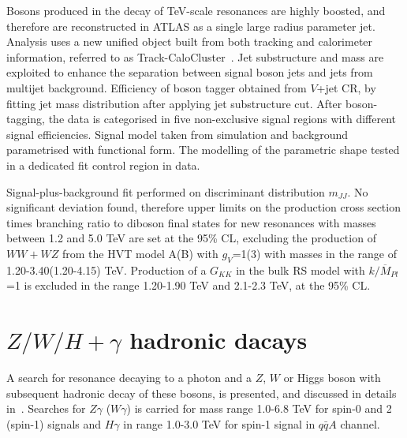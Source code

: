 \documentclass{PoS}
\begin{document}
Bosons produced in the decay of TeV-scale resonances are highly boosted, and therefore are reconstructed in ATLAS as a single large radius parameter jet. 
Analysis uses a new unified object built from both tracking and calorimeter information, referred to as Track-CaloCluster~\cite{ATL-PHYS-PUB-2017-015}. 
Jet substructure and mass are exploited to enhance the separation between signal boson jets and jets from multijet background. 
Efficiency of boson tagger obtained from $V$+jet CR, by fitting jet mass distribution after applying jet substructure cut. %
After boson-tagging, the data is categorised in five non-exclusive signal regions with different signal efficiencies.
Signal model taken from simulation and background parametrised with functional form. The modelling of the parametric shape tested in a dedicated fit control region in data.

Signal-plus-background fit performed on discriminant distribution $m_{JJ}$.
No significant deviation found, therefore upper limits on the production cross section times branching ratio to diboson final states for new resonances with masses between 1.2 and 5.0 TeV are set at the 95\% CL, excluding the production of $WW+WZ$ from the HVT model A(B) with $g_V$=1(3) with masses in the range of 1.20-3.40(1.20-4.15) TeV. 
Production of a $G_{KK}$ in the bulk RS model with $k/\overline{M}_{Pl}$=1 is excluded in the range 1.20-1.90 TeV and 2.1-2.3 TeV, at the 95\% CL.

\section{$Z/W/H+\gamma$ hadronic dacays}
\label{sec:gV}
A search for resonance decaying to a photon and a $Z$, $W$ or Higgs boson with subsequent hadronic decay of these bosons, is presented, and discussed in details in~\cite{EXOT-2016-30}. Searches for $Z\gamma$ ($W\gamma$) is carried for mass range 1.0-6.8 TeV for spin-0 and 2 (spin-1) signals and $H\gamma$ in range 1.0-3.0 TeV for spin-1 signal in $q\bar{q}A$ channel.
\end{document}
